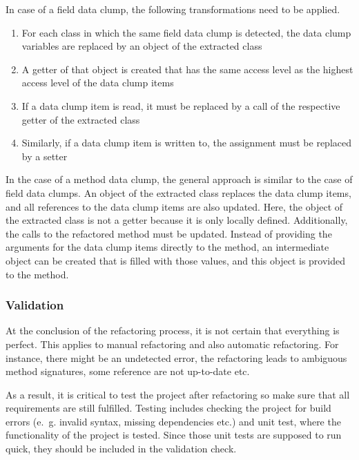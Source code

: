 In case of a field data clump, the following transformations need to be applied.

\begin{enumerate}
    \item For each class in which the same field data clump is detected, the data clump variables are replaced by an object of the extracted class
    \item A getter of that object is created that has the same access level as the highest access level of the data clump items
    \item If a data clump item is read, it must be replaced by a call of the respective getter of the extracted class
    \item Similarly, if a data clump item is written to, the assignment must be replaced by a setter
\end{enumerate}



In the case of a method data clump, the general approach is similar to the case of field data clumps. An object of the extracted class replaces the data clump items, and all references to the data clump items are also updated. Here, the object of the extracted class is not a getter because it is only locally defined. Additionally, the calls to the refactored method must be updated. Instead of providing the arguments for the data clump items directly to the method, an intermediate object can be created that is filled with those values, and this object is provided to the method. 

\subsubsection{Validation}

At the conclusion of the refactoring process, it is not certain that everything is perfect. This applies to manual refactoring and also automatic refactoring. For instance, there might be an undetected error, the refactoring leads to ambiguous method signatures, some reference are not up-to-date etc.

As a result, it is critical to test the project after refactoring so make sure that all requirements are still fulfilled. Testing includes checking the project for build errors (e.~g. invalid syntax, missing dependencies etc.) and unit test, where the functionality of the project is tested. Since those unit tests are supposed to run quick, they should be included in the validation check. 

